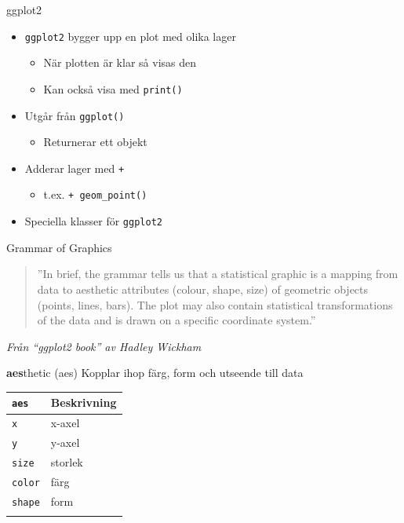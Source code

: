 \documentclass[
  11pt,
  ignorenonframetext,
  handout]{beamer}
\providecommand{\tightlist}{%
  \setlength{\itemsep}{0pt}\setlength{\parskip}{0pt}}
\begin{document}
\begin{frame}{ggplot2}
\label{ggplot2-4}
\begin{itemize}
\tightlist
\item
  \texttt{ggplot2} bygger upp en plot med olika lager

  \begin{itemize}
  \tightlist
  \item
    När plotten är klar så visas den
  \item
    Kan också visa med \texttt{print()}
  \end{itemize}
\item
  Utgår från \texttt{ggplot()}

  \begin{itemize}
  \tightlist
  \item
    Returnerar ett objekt
  \end{itemize}
\item
  Adderar lager med \texttt{+}

  \begin{itemize}
  \tightlist
  \item
    t.ex. \texttt{+ geom\_point()}
  \end{itemize}
\item
  Speciella klasser för \texttt{ggplot2}
\end{itemize}
\end{frame}

\begin{frame}{Grammar of Graphics}
\label{grammar-of-graphics-1}
\begin{quote}
''In brief, the grammar tells us that a statistical graphic is a mapping
from data to aesthetic attributes (colour, shape, size) of geometric
objects (points, lines, bars). The plot may also contain statistical
transformations of the data and is drawn on a specific coordinate
system.''
\end{quote}

\emph{Från ``ggplot2 book'' av Hadley Wickham}
\end{frame}

\begin{frame}[fragile]{\textbf{aes}thetic (aes)}
\label{aesthetic-aes}
Kopplar ihop färg, form och utseende till data

\begin{longtable}[]{@{}ll@{}}
\toprule\noalign{}
\texttt{aes} & Beskrivning \\
\midrule\noalign{}
\endhead
\texttt{x} & x-axel \\
\texttt{y} & y-axel \\
\texttt{size} & storlek \\
\texttt{color} & färg \\
\texttt{shape} & form \\
\bottomrule\noalign{}
\end{longtable}
\end{frame}
\end{document}
